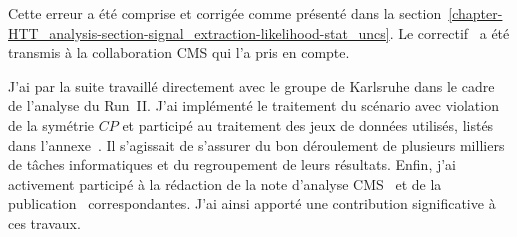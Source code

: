 Cette erreur a été comprise et corrigée comme présenté dans la section~\ref{chapter-HTT_analysis-section-signal_extraction-likelihood-stat_uncs}.
Le correctif~\cite{BBB_PR} a été transmis à la collaboration CMS qui l'a pris en compte.
\par
J'ai par la suite travaillé directement avec le groupe de Karlsruhe dans le cadre de l'analyse du Run~II.
J'ai implémenté le traitement du scénario avec violation de la symétrie $CP$
et
participé au traitement des jeux de données utilisés, listés dans l'annexe~.
Il s'agissait de s'assurer du bon déroulement de plusieurs milliers de tâches informatiques et du regroupement de leurs résultats.
Enfin, j'ai activement participé à la rédaction
de la note d'analyse CMS~\cite{CMS-NOTE-2020-218}
et
de la publication~\cite{HIG-21-001}
correspondantes.
J'ai ainsi apporté une contribution significative à ces travaux.
